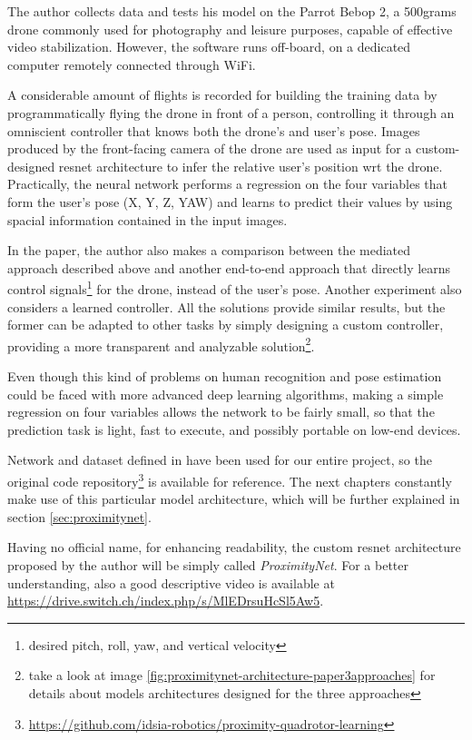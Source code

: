 The author collects data and tests his model on the Parrot Bebop 2, a 500grams drone commonly used for photography and leisure purposes, capable of effective video stabilization. However, the software runs off-board, on a dedicated computer remotely connected through WiFi. 

A considerable amount of flights is recorded for building the training data by programmatically flying the drone in front of a person, controlling it through an omniscient controller that knows both the drone's and user's pose. Images produced by the front-facing camera of the drone are used as input for a custom-designed \gls{resnet} architecture to infer the relative user's position \gls{wrt} the drone. Practically, the neural network performs a regression on the four variables that form the user's pose (X, Y, Z, YAW) and learns to predict their values by using spacial information contained in the input images. 

In the paper, the author also makes a comparison between the mediated approach described above and another end-to-end approach that directly learns control signals\footnote{desired pitch, roll, yaw, and vertical velocity} for the drone, instead of the user's pose. Another experiment also considers a learned controller. All the solutions provide similar results, but the former can be adapted to other tasks by simply designing a custom controller, providing a more transparent and analyzable solution\footnote{take a look at image \ref{fig:proximitynet-architecture-paper3approaches} for details about models architectures designed for the three approaches}.

Even though this kind of problems on human recognition and pose estimation could be faced with more advanced deep learning algorithms, making a simple regression on four variables allows the network to be fairly small, so that the prediction task is light, fast to execute, and possibly portable on low-end devices.

\medskip

Network and dataset defined in \cite{mantegazza2019visionbased} have been used for our entire project, so the original code repository\footnote{\url{https://github.com/idsia-robotics/proximity-quadrotor-learning}} is available for reference. The next chapters constantly make use of this particular model architecture, which will be further explained in section \ref{sec:proximitynet}. 

Having no official name, for enhancing readability, the custom \gls{resnet} architecture proposed by the author will be simply called \textit{ProximityNet}. For a better understanding, also a good descriptive video is available at \url{https://drive.switch.ch/index.php/s/MlEDrsuHcSl5Aw5}.



